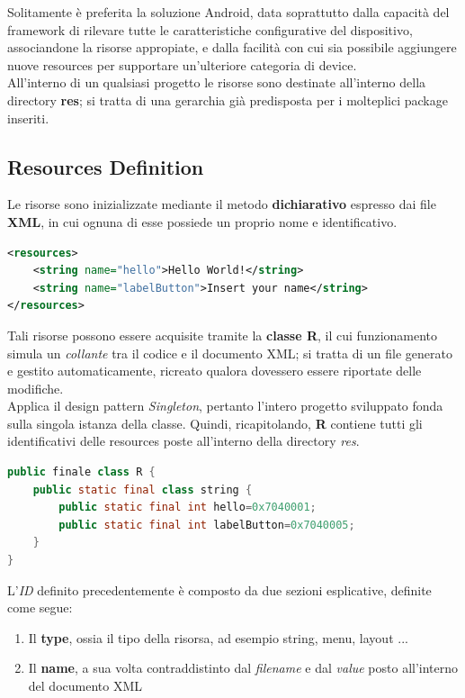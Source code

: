 \documentclass{article}
\begin{document}
Solitamente è preferita la soluzione Android, data soprattutto dalla capacità del framework di rilevare tutte le caratteristiche configurative del dispositivo, associandone la risorse appropiate, e dalla facilità con cui sia possibile aggiungere nuove resources per supportare un'ulteriore categoria di device.\vspace*{14pt}\\
All'interno di un qualsiasi progetto le risorse sono destinate all'interno della directory \textbf{res}; si tratta di una gerarchia già predisposta per i molteplici package inseriti.

\subsection*{Resources Definition}
Le risorse sono inizializzate mediante il metodo \textbf{dichiarativo} espresso dai file \textbf{XML}, in cui ognuna di esse possiede un proprio nome e identificativo.\vspace*{7pt}
\begin{lstlisting}[language=XML, title=Dichiarazione delle risorse mediante file XML]
<resources> 
    <string name="hello">Hello World!</string>
    <string name="labelButton">Insert your name</string>
</resources>
\end{lstlisting}
Tali risorse possono essere acquisite tramite la \textbf{classe R}, il cui funzionamento simula un \textit{collante} tra il codice e il documento XML; si tratta di un file generato e gestito automaticamente, ricreato qualora dovessero essere riportate delle modifiche.\vspace*{7pt}\\
Applica il design pattern \textit{Singleton}, pertanto l'intero progetto sviluppato fonda sulla singola istanza della classe. Quindi, ricapitolando, \textbf{R} contiene tutti gli identificativi delle resources poste all'interno della directory \textit{res}.\vspace*{7pt}
\begin{lstlisting}[language=JAVA, title=Definizione della classe R]
public finale class R {
    public static final class string {
        public static final int hello=0x7040001;
        public static final int labelButton=0x7040005;
    }    
}
\end{lstlisting}
L'\textit{ID} definito precedentemente è composto da due sezioni esplicative, definite come segue:
\begin{enumerate}
    \itemsep0em
    \renewcommand*{\labelenumi}{-}
    \item Il \textbf{type}, ossia il tipo della risorsa, ad esempio string, menu, layout ...
    \item Il \textbf{name}, a sua volta contraddistinto dal \textit{filename} e dal \textit{value} posto all'interno del documento XML 
\end{enumerate}
\end{document}
